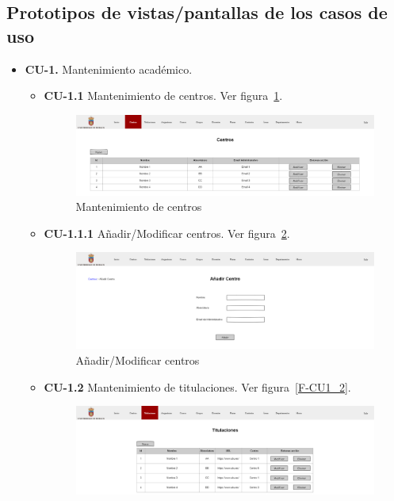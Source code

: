 \subsection{Prototipos de vistas/pantallas de los casos de uso}
\begin{itemize}
	\item \textbf{CU-1.} Mantenimiento académico.
	\begin{itemize}
		\item \textbf{CU-1.1} Mantenimiento de centros. Ver figura~\ref{F-CU1_1}.
		\begin{figure}[!h]
		\centering
		\includegraphics[width=\textwidth]{../img/Anexos/Vistas/centros.png}
		\caption{Mantenimiento de centros}\label{F-CU1_1}
		\end{figure}
		\FloatBarrier
		\item \textbf{CU-1.1.1} Añadir/Modificar centros. Ver figura~\ref{F-CU1_1_1}.
		\begin{figure}[!h]
		\centering
		\includegraphics[width=\textwidth]{../img/Anexos/Vistas/add_centro.png}
		\caption{Añadir/Modificar centros}\label{F-CU1_1_1}
		\end{figure}
		\FloatBarrier
\newpage
		\item \textbf{CU-1.2} Mantenimiento de titulaciones. Ver figura~\ref{F-CU1_2}.
		\begin{figure}[!h]
		\centering
		\includegraphics[width=\textwidth]{../img/Anexos/Vistas/titulaciones.png}

\end{figure}
\end{itemize}
\end{itemize}
